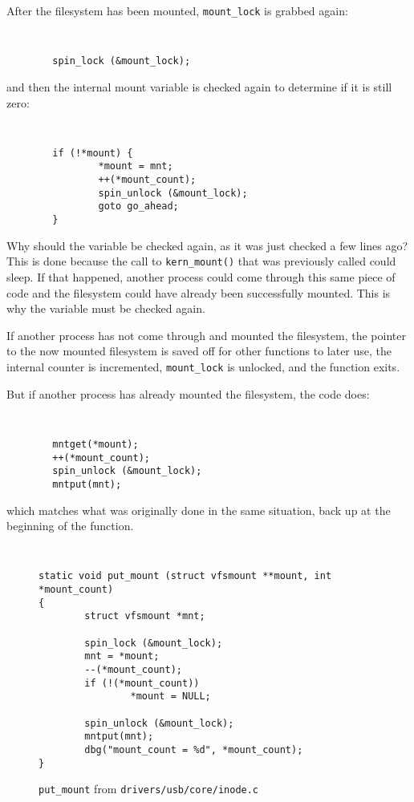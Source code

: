 \documentclass[twocolumn]{article}
\begin{document}
After the filesystem has been mounted, {\tt mount\_lock} is grabbed again:
{\tt \small
\begin{verbatim}
        spin_lock (&mount_lock);
\end{verbatim}
}
and then the internal mount variable is checked again to determine if it is
still zero:
{\tt \small
\begin{verbatim}
        if (!*mount) {
                *mount = mnt;
                ++(*mount_count);
                spin_unlock (&mount_lock);
                goto go_ahead;
        }
\end{verbatim}
}

Why should the variable be checked again, as it was just checked a few
lines ago?  This is done because the call to {\tt kern\_mount()} that was
previously called could sleep.  If that happened, another process could
come through this same piece of code and the filesystem could have already
been successfully mounted.  This is why the variable must be checked again.

If another process has not come through and mounted the filesystem, the
pointer to the now mounted filesystem is saved off for other functions to
later use, the internal counter is incremented, {\tt mount\_lock} is
unlocked, and the function exits.

But if another process has already mounted the filesystem, the code does:
{\tt \small
\begin{verbatim}
        mntget(*mount);
        ++(*mount_count);
        spin_unlock (&mount_lock);
        mntput(mnt);
\end{verbatim}
}
which matches what was originally done in the same situation, back up at
the beginning of the function.

\begin{figure*}[tb]
{\tt \small
\begin{verbatim}
static void put_mount (struct vfsmount **mount, int *mount_count)
{
        struct vfsmount *mnt;

        spin_lock (&mount_lock);
        mnt = *mount;
        --(*mount_count);
        if (!(*mount_count))
                *mount = NULL;

        spin_unlock (&mount_lock);
        mntput(mnt);
        dbg("mount_count = %d", *mount_count);
}
\end{verbatim}
}
\caption{\footnotesize{
{\tt put\_mount} from {\tt drivers/usb/core/inode.c}}}
\label{figure:put_mount}
\end{figure*}
\end{document}
